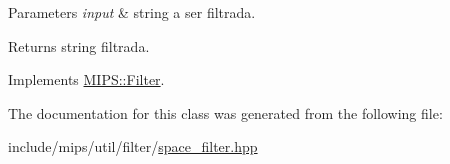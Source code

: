 \begin{DoxyParams}{Parameters}
{\em input} & string a ser filtrada. \\
\hline
\end{DoxyParams}
\begin{DoxyReturn}{Returns}
string filtrada. 
\end{DoxyReturn}


Implements \hyperlink{classMIPS_1_1Filter_a752c258e9d4090dd774fa4e829c95ae1}{M\+I\+P\+S\+::\+Filter}.



The documentation for this class was generated from the following file\+:\begin{DoxyCompactItemize}
\item 
include/mips/util/filter/\hyperlink{space__filter_8hpp}{space\+\_\+filter.\+hpp}\end{DoxyCompactItemize}
